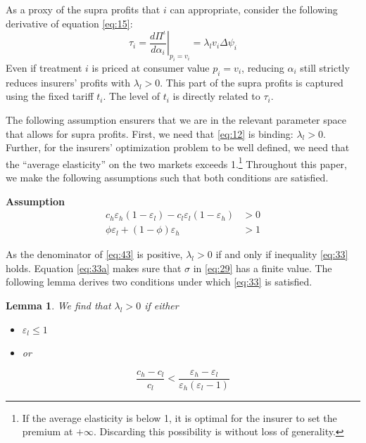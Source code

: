 \documentclass[a4paper,12pt]{article}
\newtheorem{lemma}{Lemma}
\begin{document}
As a proxy of the supra profits that \(i\) can appropriate, consider the following derivative of equation \eqref{eq:15}:
\begin{equation}
\label{eq:1}
\tau_i = \left. \frac{d\Pi^{\iota}}{d\alpha_{i}} \right|_{p_i=v_i} = \lambda_l v_i \Delta \psi_i
\end{equation}
Even if treatment \(i\) is priced at consumer value \(p_i = v_i\), reducing \(\alpha_i\) still strictly reduces insurers' profits with \(\lambda_l > 0\). This part of the supra profits is captured using the fixed tariff \(t_i\). The level of \(t_i\) is directly related to \(\tau_i\).

The following assumption ensurers that we are in the relevant parameter space that allows for supra profits. First, we need that \eqref{eq:12} is binding: \(\lambda_l >0\). Further, for the insurers' optimization problem to be well defined, we need that the ``average elasticity'' on the two markets exceeds 1.\footnote{If the average elasticity is below 1, it is optimal for the insurer to set the premium at \(+\infty\). Discarding this possibility is without loss of generality.} Throughout this paper, we make the following assumptions such that both conditions are satisfied.

\textbf{Assumption}
\begin{align}
\label{eq:33}
c_h \varepsilon_h (1- \varepsilon_l )-c_l \varepsilon_l(1-\varepsilon_h) &> 0 \\
\label{eq:33a}
\phi \varepsilon_l + (1-\phi) \varepsilon_h &> 1
\end{align}

As the denominator of \eqref{eq:43} is positive, \(\lambda_l >0\) if and only if inequality \eqref{eq:33} holds. Equation \eqref{eq:33a} makes sure that \(\sigma\) in \eqref{eq:29} has a finite value. The following lemma derives two conditions under which \eqref{eq:33} is satisfied.

\begin{lemma}
\label{IC_l_binding}
We find that \(\lambda_l >0\) if either
\begin{itemize}
\item \(\varepsilon_l \leq 1\)
\item or
\end{itemize}
\begin{equation}
\label{eq:34}
\frac{c_h-c_l}{c_l} < \frac{\varepsilon_h - \varepsilon_l}{\varepsilon_h (\varepsilon_l -1)}
\end{equation}
\end{lemma}
\end{document}
